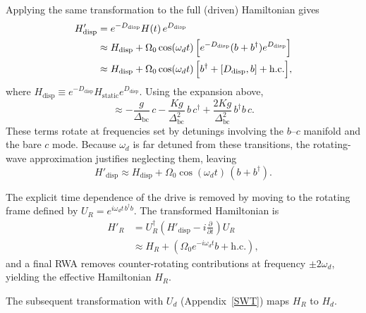 Applying the same transformation to the full (driven) Hamiltonian gives
\begin{align}
    H'_{\text{disp}}
    &= e^{-D_{\text{disp}}} H(t)\, e^{D_{\text{disp}}}
    \nonumber \\
    &\approx H_{\text{disp}}
    + \Omega_0 \cos(\omega_d t)\,
    \Bigl[e^{-D_{\text{disp}}} (b + b^\dagger) e^{D_{\text{disp}}}\Bigr]
    \nonumber \\
    &\approx H_{\text{disp}}
    + \Omega_0 \cos(\omega_d t)\,
    \Bigl[b^\dagger + [D_{\text{disp}}, b] + \text{h.c.}\Bigr],
\end{align}
where $H_{\text{disp}} \equiv e^{-D_{\text{disp}}} H_{\text{static}} e^{D_{\text{disp}}}$. Using the expansion above,
\begin{equation}
[D_{\text{disp}}, b] \approx
-\frac{g}{\Delta_{\text{bc}}}\, c
-\frac{Kg}{\Delta_{\text{bc}}^2}\, b\, c^\dagger
+\frac{2Kg}{\Delta_{\text{bc}}^2}\, b^\dagger b\, c .
\end{equation}
These terms rotate at frequencies set by detunings involving the $b$--$c$ manifold and the bare $c$ mode. Because $\omega_d$ is far detuned from these transitions, the rotating-wave approximation justifies neglecting them, leaving
\begin{equation}
H'_{\text{disp}} \approx H_{\text{disp}} + \Omega_0 \cos(\omega_d t)\,(b + b^\dagger).
\end{equation}

The explicit time dependence of the drive is removed by moving to the rotating frame defined by
$U_R = e^{i \omega_d t\, b^\dagger b}$. The transformed Hamiltonian is
\begin{align}
    H'_R
    &= U_R^\dagger \left( H'_{\text{disp}} - i \frac{\partial}{\partial t} \right) U_R
    \nonumber \\
    &\approx H_R + \left( \Omega_0 e^{-i \omega_d t} b + \text{h.c.} \right),
\end{align}
and a final RWA removes counter-rotating contributions at frequency $\pm2\omega_d$, yielding the effective Hamiltonian $H_R$.

The subsequent transformation with $U_d$ (Appendix~\ref{SWT}) maps $H_R$ to $H_d$.



